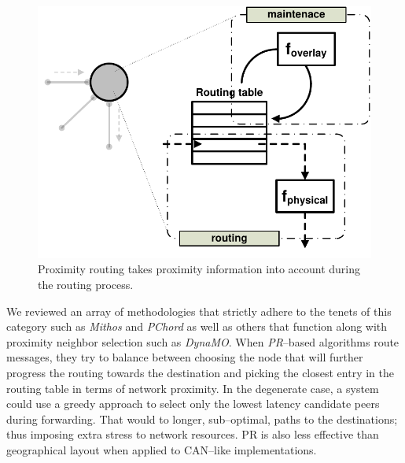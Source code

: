 \begin{figure}[ht]
\centering
  \includegraphics[scale=0.4]{img/pdf/proximity-routing.pdf}
\caption{Proximity routing takes proximity information into account during the
routing process.}
\label{figure:proximity-routing}
\end{figure}
We reviewed an array of methodologies that strictly adhere to 
the tenets of this category such as \emph{Mithos} and
\emph{PChord} as well as others that function along with 
proximity neighbor selection such as \emph{DynaMO}.
When \emph{PR}--based algorithms route messages, they try to balance between
choosing the node that will further progress the routing towards the
destination and picking the closest entry in the routing table
in terms of network proximity. 
In the degenerate case, a system could use a greedy approach to select
only the lowest latency candidate peers during forwarding. That would to
longer, sub--optimal, paths to the destinations; thus imposing
extra stress to network resources. PR is also less
effective than geographical layout when applied to CAN--like implementations.



